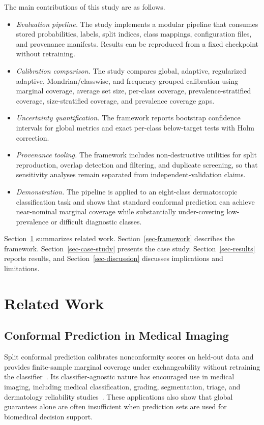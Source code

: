 ﻿\documentclass[preprint,12pt]{elsarticle}
\begin{document}
The main contributions of this study are as follows.
\begin{itemize}
    \item \textit{Evaluation pipeline.} The study implements a modular pipeline that consumes stored probabilities, labels, split indices, class mappings, configuration files, and provenance manifests. Results can be reproduced from a fixed checkpoint without retraining.
    \item \textit{Calibration comparison.} The study compares global, adaptive, regularized adaptive, Mondrian/classwise, and frequency-grouped calibration using marginal coverage, average set size, per-class coverage, prevalence-stratified coverage, size-stratified coverage, and prevalence coverage gaps.
    \item \textit{Uncertainty quantification.} The framework reports bootstrap confidence intervals for global metrics and exact per-class below-target tests with Holm correction.
    \item \textit{Provenance tooling.} The framework includes non-destructive utilities for split reproduction, overlap detection and filtering, and duplicate screening, so that sensitivity analyses remain separated from independent-validation claims.
    \item \textit{Demonstration.} The pipeline is applied to an eight-class dermatoscopic classification task and shows that standard conformal prediction can achieve near-nominal marginal coverage while substantially under-covering low-prevalence or difficult diagnostic classes.
\end{itemize}

Section~\ref{sec-related-work} summarizes related work. Section~\ref{sec-framework} describes the framework. Section~\ref{sec-case-study} presents the case study. Section~\ref{sec-results} reports results, and Section~\ref{sec-discussion} discusses implications and limitations.

\section{Related Work}
\label{sec-related-work}

\subsection{Conformal Prediction in Medical Imaging}

Split conformal prediction calibrates nonconformity scores on held-out data and provides finite-sample marginal coverage under exchangeability without retraining the classifier~\cite{vovk2005algorithmic,papadopoulos2002inductive}. Its classifier-agnostic nature has encouraged use in medical imaging, including medical classification, grading, segmentation, triage, and dermatology reliability studies~\cite{hirsch2024conformalized,lu2022improving_miccai,mossina2025conformal,fayyad2023empirical,angelopoulos2024conformal,mehrtens2025pitfalls}. These applications also show that global guarantees alone are often insufficient when prediction sets are used for biomedical decision support.
\end{document}
